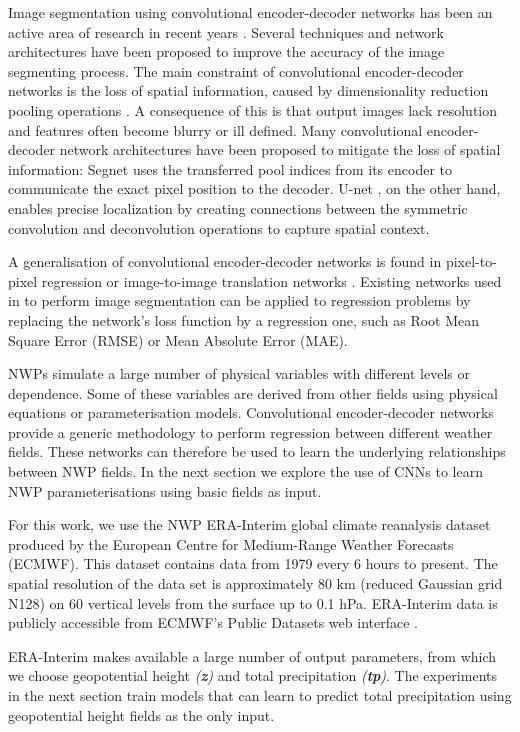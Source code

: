 \documentclass[twocol]{ametsoc}
\begin{document}
Image segmentation using convolutional encoder-decoder networks has been an active area of research in recent years \citep{krizhevsky2012imagenet,chen2018deeplab}. Several techniques and network architectures have been proposed to improve the accuracy of the image segmenting process. The main constraint of convolutional encoder-decoder networks is the loss of spatial information, caused by dimensionality reduction pooling operations \citep{scherer2010evaluation}. A consequence of this is that output images lack resolution and features often become blurry or ill defined. Many convolutional encoder-decoder network architectures have been proposed to mitigate the loss of spatial information: Segnet \citep{badrinarayanan2017segnet} uses the transferred pool indices from its encoder to communicate the exact pixel position to the decoder. U-net \citep{ronneberger2015u}, on the other hand, enables precise localization by creating connections between the symmetric convolution and deconvolution operations to capture spatial context.

A generalisation of convolutional encoder-decoder networks is found in pixel-to-pixel regression or image-to-image translation networks \citep{isola2017image}. Existing networks used in to perform image segmentation can be applied to regression problems by replacing the network's loss function by a regression one, such as Root Mean Square Error (RMSE) or Mean Absolute Error (MAE).

NWPs simulate a large number of physical variables with different levels or dependence. Some of these variables are derived from other fields using physical equations or parameterisation models. Convolutional encoder-decoder networks provide a generic methodology to perform regression between different weather fields. These networks can therefore be used to learn the underlying relationships between NWP fields. In the next section we explore the use of CNNs to learn NWP parameterisations using basic fields as input.

For this work, we use the NWP ERA-Interim \citep{dee2011era} global climate reanalysis dataset produced by the European Centre for Medium-Range Weather Forecasts (ECMWF). This dataset contains data from 1979 every 6 hours to present. The spatial resolution of the data set is approximately 80 km (reduced Gaussian grid N128) on 60 vertical levels from the surface up to 0.1 hPa. ERA-Interim data is publicly accessible from ECMWF's Public Datasets web interface \citep{1321008426928}.

ERA-Interim makes available a large number of output parameters, from which we choose geopotential height \textit{(\textbf{z})} and total precipitation \textit{(\textbf{tp})}. The experiments in the next section train models that can learn to predict total precipitation using geopotential height fields as the only input.
\end{document}
